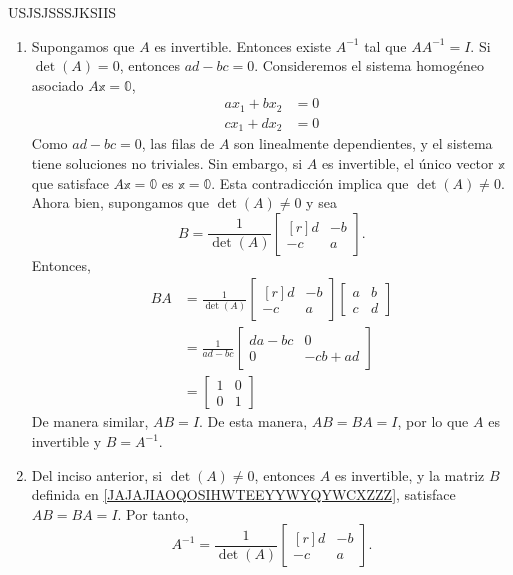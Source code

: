 \begin{theorem}{}{USJSJSSSJKSIIS}
    \tcblower
    \demostracion
    \begin{enumerate}[label=\roman*), topsep=6pt, itemsep=0pt]
        \item Supongamos que $A$ es invertible. Entonces existe $A^{-1}$ tal que $AA^{-1} = I$. Si $\det(A) = 0$, entonces $ad - bc = 0$. Consideremos el sistema homogéneo asociado $A\mathbb{x} = \mathbb{0}$,
        \begin{align*}
            ax_1 + bx_2 & = 0 \\
            cx_1 + dx_2 & = 0
        \end{align*}
        Como $ad - bc = 0$, las filas de $A$ son linealmente dependientes, y el sistema tiene soluciones no triviales. Sin embargo, si $A$ es invertible, el único vector $\mathbb{x}$ que satisface $A\mathbb{x} = \mathbb{0}$ es $\mathbb{x} = \mathbb{0}$. Esta contradicción implica que $\det(A) \neq 0$. Ahora bien, supongamos que $\det(A) \neq 0$ y sea
        \begin{equation}
            B = \frac{1}{\det(A)} \begin{bmatrix*}[r]
                d & -b \\
                -c & a
            \end{bmatrix*}. \label{JAJAJIAOQOSIHWTEEYYWYQYWCXZZZ}
        \end{equation}
        Entonces,
        \begin{align*}
            BA & = \frac{1}{\det(A)} \begin{bmatrix*}[r]
                d & -b \\
                -c & a
            \end{bmatrix*} \begin{bmatrix}
                a & b \\
                c & d
            \end{bmatrix} \\
            & = \frac{1}{ad - bc} \begin{bmatrix}
                da - bc & 0 \\
                0 & -cb + ad
            \end{bmatrix} \\
            & = \begin{bmatrix}
                1 & 0 \\
                0 & 1
            \end{bmatrix}
        \end{align*}
        De manera similar, $AB = I$. De esta manera, $AB = BA = I$, por lo que $A$ es invertible y $B = A^{-1}$.
        \item Del inciso anterior, si $\det(A) \neq 0$, entonces $A$ es invertible, y la matriz $B$ definida en \eqref{JAJAJIAOQOSIHWTEEYYWYQYWCXZZZ}, satisface $AB = BA = I$. Por tanto,
        $$A^{-1} = \frac{1}{\det(A)} \begin{bmatrix*}[r]
            d & -b \\
            -c & a
        \end{bmatrix*}.$$
    \end{enumerate}
\end{theorem}

